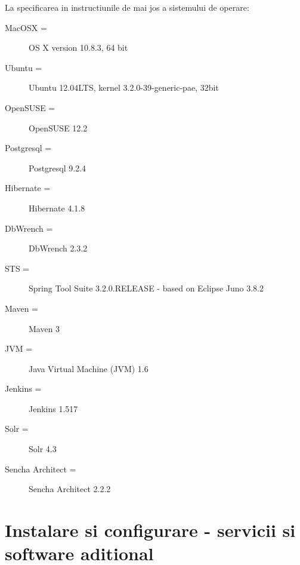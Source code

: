 La specificarea in instructiunile de mai jos a sistemului de operare:
\begin{description} 
\item [MacOSX =] OS X version 10.8.3, 64 bit
\item [Ubuntu =] Ubuntu 12.04LTS, kernel 3.2.0-39-generic-pae, 32bit
\item [OpenSUSE = ] OpenSUSE 12.2
\item [Postgresql =] Postgresql 9.2.4
\item [Hibernate =] Hibernate 4.1.8
\item [DbWrench =] DbWrench 2.3.2
\item [STS =] Spring Tool Suite 3.2.0.RELEASE - based on Eclipse Juno 3.8.2
\item [Maven =] Maven 3
\item [JVM =] Java Virtual Machine (JVM) 1.6
\item [Jenkins =] Jenkins 1.517
\item [Solr =] Solr 4.3
\item [Sencha Architect =] Sencha Architect 2.2.2
\end{description}

\section{Instalare si configurare - servicii si software aditional}

